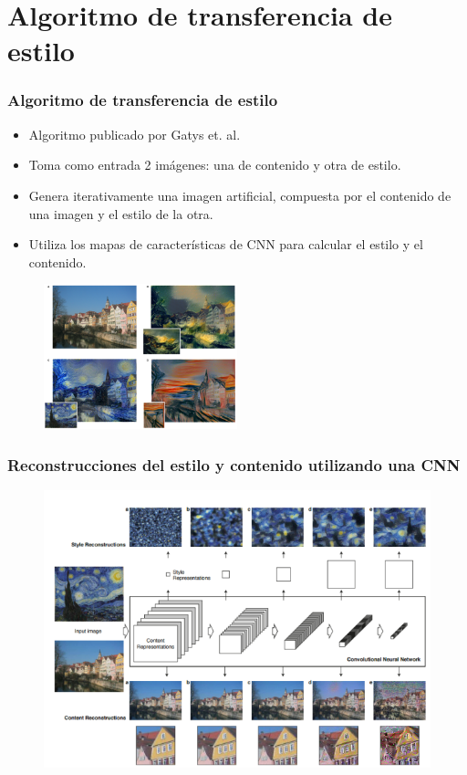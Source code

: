 \documentclass[10pt,center]{beamer}
\begin{document}
\section{Algoritmo de transferencia de estilo}
\begin{frame}
 \frametitle{Algoritmo de transferencia de estilo}
 \begin{itemize}
    \item Algoritmo publicado por Gatys et. al.
    \item Toma como entrada 2 imágenes: una de contenido y otra de estilo.
    \item Genera iterativamente una imagen artificial, compuesta por el contenido de una imagen y el estilo de la otra.
    \item Utiliza los mapas de características de CNN para calcular el estilo y el contenido.
 \end{itemize}
    \begin{figure}[h]
    \begin{center}
     \includegraphics[width=0.5\textwidth]{./img/gatys_style_transfer.png}
    \end{center}
  \end{figure} 
\end{frame}

\begin{frame}
  \frametitle{Reconstrucciones del estilo y contenido utilizando una CNN}
   \begin{figure}[h]
    \begin{center}
     \includegraphics[width=\textwidth]{./img/gatys_1.png}
    \end{center}
  \end{figure} 
\end{frame}
\end{document}
